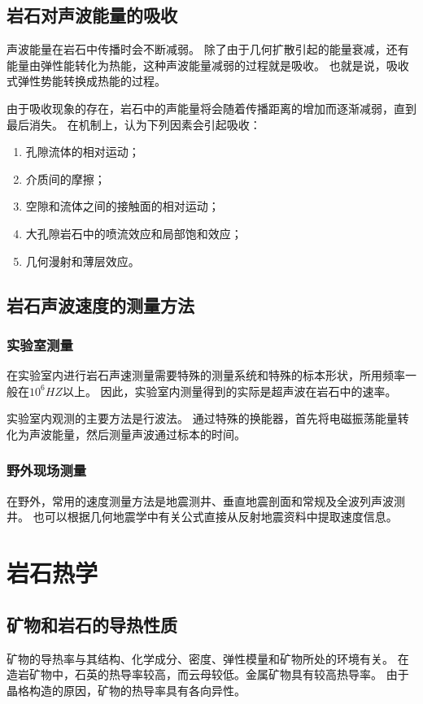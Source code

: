 \documentclass[hyperref,UTF-8,twoside]{ctexart}
\begin{document}
\subsection{岩石对声波能量的吸收}
声波能量在岩石中传播时会不断减弱。
除了由于几何扩散引起的能量衰减，还有能量由弹性能转化为热能，这种声波能量减弱的过程就是吸收。
也就是说，吸收式弹性势能转换成热能的过程。

由于吸收现象的存在，岩石中的声能量将会随着传播距离的增加而逐渐减弱，直到最后消失。
在机制上，认为下列因素会引起吸收：
\begin{enumerate}
\item 孔隙流体的相对运动；
\item 介质间的摩擦；
\item 空隙和流体之间的接触面的相对运动；
\item 大孔隙岩石中的喷流效应和局部饱和效应；
\item 几何漫射和薄层效应。
\end{enumerate}
\subsection{岩石声波速度的测量方法}
\subsubsection{实验室测量}
在实验室内进行岩石声速测量需要特殊的测量系统和特殊的标本形状，所用频率一般在$10^{6}HZ$以上。
因此，实验室内测量得到的实际是超声波在岩石中的速率。

实验室内观测的主要方法是行波法。
通过特殊的换能器，首先将电磁振荡能量转化为声波能量，然后测量声波通过标本的时间。
\subsubsection{野外现场测量}
在野外，常用的速度测量方法是地震测井、垂直地震剖面和常规及全波列声波测井。
也可以根据几何地震学中有关公式直接从反射地震资料中提取速度信息。
\section{岩石热学}
\subsection{矿物和岩石的导热性质}
矿物的导热率与其结构、化学成分、密度、弹性模量和矿物所处的环境有关。
在造岩矿物中，石英的热导率较高，而云母较低。金属矿物具有较高热导率。
由于晶格构造的原因，矿物的热导率具有各向异性。
\end{document}
